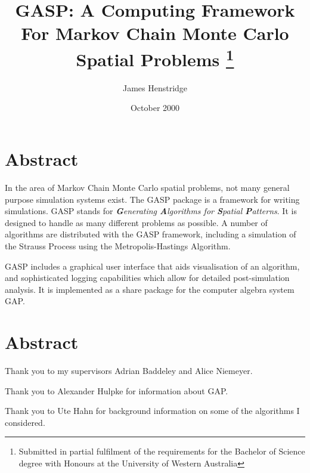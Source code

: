 \documentclass[12pt,a4paper]{book}  %
\title{
   GASP: A Computing Framework For Markov Chain Monte Carlo Spatial Problems
   \footnote{Submitted in partial fulfilment 
   of the requirements for the Bachelor 
   of Science degree with Honours at the 
   University of Western Australia}
}
\date{October 2000}
\author{James Henstridge}
\newif\ifpdf
\newcommand{\GAP}{\textsf{GAP}}
\newcommand{\abstractname}{Abstract}
\newenvironment{abstract}{\section{Abstract}}{}
\newenvironment{acknowledgements}%
   {\renewcommand{\abstractname}{Acknowledgements}%
    \begin{abstract}}
   {\end{abstract}}
\begin{document}
\ifpdf
  \DeclareGraphicsExtensions{.png,.pdf}
\else
\fi

\maketitle

\begin{abstract}
In the area of Markov Chain Monte Carlo spatial problems, not many
general purpose simulation systems exist.  The GASP package is a
framework for writing simulations.  GASP stands for
\emph{\textbf{G}enerating \textbf{A}lgorithms for \textbf{S}patial
\textbf{P}atterns}.  It is designed to handle as many
different problems as possible.  A number of algorithms are
distributed with the GASP framework, including a simulation of the
Strauss Process using the Metropolis-Hastings Algorithm.

GASP includes a graphical user interface that aids visualisation of an
algorithm, and sophisticated logging capabilities which allow for
detailed post-simulation analysis.  It is implemented as a share
package for the computer algebra system \GAP.
\end{abstract}

\begin{acknowledgements}
\noindent Thank you to my supervisors Adrian Baddeley and Alice
Niemeyer.

\noindent Thank you to Alexander Hulpke for information about \GAP.

\noindent Thank you to Ute Hahn for background information on some of the
algorithms I considered.
\end{acknowledgements}


\tableofcontents










\end{document}
